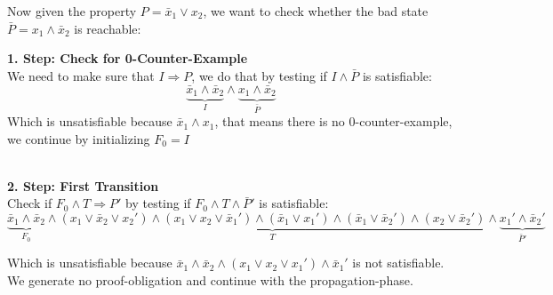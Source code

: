 \documentclass[11pt, a4paper, BCOR=10mm, ngerman]{scrbook}
\begin{document}
Now given the property $P = \bar x_1 \lor x_2$, we want to check whether the bad state $\bar P = x_1 \land \bar x_2$ is reachable: \\ \par

\textbf{1. Step: Check for 0-Counter-Example} \\ 
We need to make sure that $I \Rightarrow P$, we do that by testing if $I \land \bar P$ is satisfiable: 
\begin{equation*}
\underbrace{\bar x_1 \land \bar x_2}_{I} \land \underbrace{x_1 \land \bar x_2}_{\bar P}
\end{equation*}
Which is unsatisfiable because $\bar x_1 \land x_1$, that means there is no 0-counter-example, we continue by initializing $F_0 = I$\\ \\ \par

\textbf{2. Step: First Transition} \\
Check if $F_0 \land T \Rightarrow P'$ by testing if $F_0 \land T \land \bar P'$ is satisfiable:
\begin{equation*}
\underbrace{\bar x_1 \land \bar x_2}_{F_0} \land \underbrace{( x_1 \lor \bar x_2 \lor x_2') \land (x_1 \lor x_2 \lor \bar x_1') \land (\bar x_1 \lor x_1') \land (\bar x_1 \lor \bar x_2') \land (x_2 \lor \bar x_2')}_{T} \land \underbrace{x_1' \land \bar x_2'}_{\bar P'}
\end{equation*}

Which is unsatisfiable because $\bar x_1 \land \bar x_2 \land (x_1 \lor x_2 \lor x_1') \land \bar x_1'$ is not satisfiable. We generate no proof-obligation and continue with the propagation-phase. \\ \\
\end{document}
